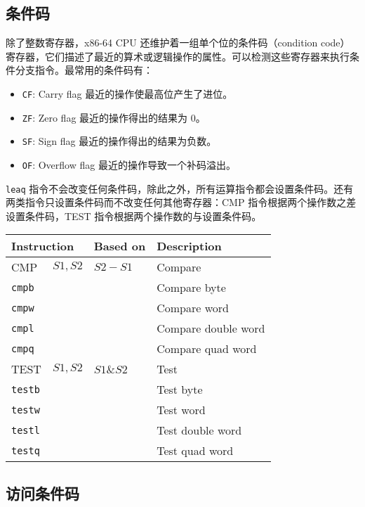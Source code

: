 \subsection{条件码}

除了整数寄存器，x86-64 CPU 还维护着一组单个位的条件码（condition code）寄存器，它们描述了最近的算术或逻辑操作的属性。可以检测这些寄存器来执行条件分支指令。最常用的条件码有：
\begin{itemize}
    \item \verb|CF|: Carry flag 最近的操作使最高位产生了进位。
    \item \verb|ZF|: Zero flag 最近的操作得出的结果为 0。
    \item \verb|SF|: Sign flag 最近的操作得出的结果为负数。
    \item \verb|OF|: Overflow flag 最近的操作导致一个补码溢出。
\end{itemize}

\verb|leaq| 指令不会改变任何条件码，除此之外，所有运算指令都会设置条件码。还有两类指令只设置条件码而不改变任何其他寄存器：CMP 指令根据两个操作数之差设置条件码，TEST 指令根据两个操作数的与设置条件码。

\begin{table}[!ht]
    \centering
    \begin{tabular}{llll}
        \toprule
        \multicolumn{2}{l}{Instruction} & Based on & Description \\
        \midrule
        CMP & $S1, S2$ & $S2 - S1$ & Compare \\
        \quad\texttt{cmpb} & & & Compare byte \\
        \quad\texttt{cmpw} & & & Compare word \\
        \quad\texttt{cmpl} & & & Compare double word \\
        \quad\texttt{cmpq} & & & Compare quad word \\
        TEST & $S1, S2$ & $S1 \& S2$ & Test \\
        \quad\texttt{testb} & & & Test byte \\
        \quad\texttt{testw} & & & Test word \\
        \quad\texttt{testl} & & & Test double word \\
        \quad\texttt{testq} & & & Test quad word \\
        \bottomrule
    \end{tabular}
\end{table}

\subsection{访问条件码}

